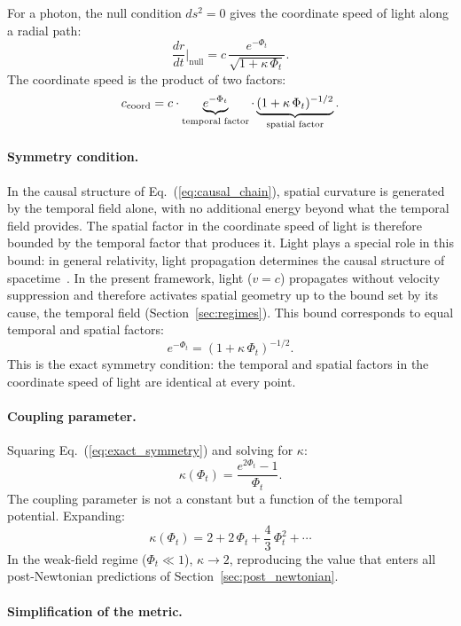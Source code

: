 \documentclass[12pt]{article}
\begin{document}
For a photon, the null condition $ds^2 = 0$ gives the coordinate speed of light along a radial path:
$$
\frac{dr}{dt}\bigg|_{\text{null}} = c\,\frac{e^{-\Phi_t}}{\sqrt{1 + \kappa\,\Phi_t}}.
$$
The coordinate speed is the product of two factors:
$$
c_{\rm coord} = c \cdot \underbrace{e^{-\Phi_t}}_{\text{temporal factor}} \cdot \underbrace{(1 + \kappa\,\Phi_t)^{-1/2}}_{\text{spatial factor}}.
$$

\paragraph{Symmetry condition.}

In the causal structure of Eq.~(\ref{eq:causal_chain}), spatial curvature is generated by the temporal field alone, with no additional energy beyond what the temporal field provides. The spatial factor in the coordinate speed of light is therefore bounded by the temporal factor that produces it. Light plays a special role in this bound: in general relativity, light propagation determines the causal structure of spacetime~\cite{Hawking1973}. In the present framework, light ($v = c$) propagates without velocity suppression and therefore activates spatial geometry up to the bound set by its cause, the temporal field (Section~\ref{sec:regimes}). This bound corresponds to equal temporal and spatial factors:
\begin{equation}
e^{-\Phi_t} = (1 + \kappa\,\Phi_t)^{-1/2}.
\label{eq:exact_symmetry}
\end{equation}
This is the exact symmetry condition: the temporal and spatial factors in the coordinate speed of light are identical at every point.

\paragraph{Coupling parameter.}

Squaring Eq.~(\ref{eq:exact_symmetry}) and solving for $\kappa$:
\begin{equation}
\kappa(\Phi_t) = \frac{e^{2\Phi_t} - 1}{\Phi_t}.
\label{eq:kappa_function}
\end{equation}
The coupling parameter is not a constant but a function of the temporal potential. Expanding:
$$
\kappa(\Phi_t) = 2 + 2\,\Phi_t + \frac{4}{3}\,\Phi_t^2 + \cdots
$$
In the weak-field regime ($\Phi_t \ll 1$), $\kappa \to 2$, reproducing the value that enters all post-Newtonian predictions of Section~\ref{sec:post_newtonian}.

\paragraph{Simplification of the metric.}
\end{document}
